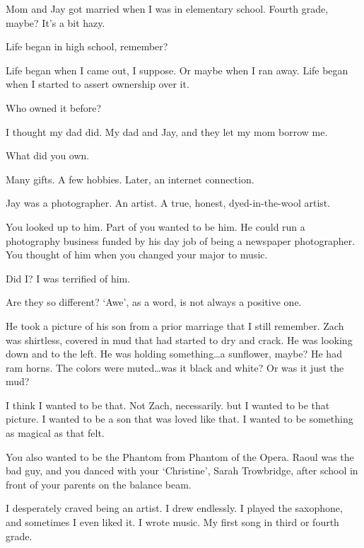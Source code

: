 Mom and Jay got married when I was in elementary school. Fourth grade, maybe? It's a bit hazy.

\begin{ally}
Life began in high school, remember?
\end{ally}
Life began when I came out, I suppose. Or maybe when I ran away. Life began when I started to assert ownership over it.

\begin{ally}
Who owned it before?
\end{ally}
I thought my dad did. My dad and Jay, and they let my mom borrow me.

\begin{ally}
What did you own.
\end{ally}
Many gifts. A few hobbies. Later, an internet connection.
\newpage

Jay was a photographer. An artist. A true, honest, dyed-in-the-wool artist.

\begin{ally}
You looked up to him. Part of you wanted to be him. He could run a photography business funded by his day job of being a newspaper photographer. You thought of him when you changed your major to music.
\end{ally}
Did I? I was terrified of him.

\begin{ally}
Are they so different? `Awe', as a word, is not always a positive one.
\end{ally}
He took a picture of his son from a prior marriage that I still remember. Zach was shirtless, covered in mud that had started to dry and crack. He was looking down and to the left. He was holding something\ldots{}a sunflower, maybe? He had ram horns. The colors were muted\ldots{}was it black and white? Or was it just the mud?

I think I wanted to be that. Not Zach, necessarily. but I wanted to be that picture. I wanted to be a son that was loved like that. I wanted to be something as magical as that felt.

\begin{ally}
You also wanted to be the Phantom from Phantom of the Opera. Raoul was the bad guy, and you danced with your `Christine', Sarah Trowbridge, after school in front of your parents on the balance beam.
\end{ally}
I desperately craved being an artist. I drew endlessly. I played the saxophone, and sometimes I even liked it. I wrote music. My first song in third or fourth grade.

